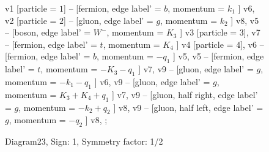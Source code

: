 \documentclass{revtex4}
\begin{document}
\begin{figure}[!htb]
\begin{center}
{    %
v1 [particle = \(1\)] -- [fermion, edge label' = \(b\), momentum = \(k_{1}\) ] v6, 
v2 [particle = \(2\)] -- [gluon, edge label' = \(g\), momentum = \(k_{2}\) ] v8, 
v5 -- [boson, edge label' = \(W^{-}\), momentum = \(K_{3}\) ] v3 [particle = \(3\)], 
v7 -- [fermion, edge label' = \(t\), momentum = \(K_{4}\) ] v4 [particle = \(4\)], 
v6 -- [fermion, edge label' = \(b\), momentum = \(-q_{1}\) ] v5, 
v5 -- [fermion, edge label' = \(t\), momentum = \(-K_{3} - q_{1}\) ] v7, 
v9 -- [gluon, edge label' = \(g\), momentum = \(-k_{1} - q_{1}\) ] v6, 
v9 -- [gluon, edge label' = \(g\), momentum = \(K_{3} + K_{4} + q_{1}\) ] v7, 
v9 -- [gluon, half right, edge label' = \(g\), momentum = \(-k_{2} + q_{2}\) ] v8, 
v9 -- [gluon, half left, edge label' = \(g\), momentum = \(-q_{2}\) ] v8, 
};
\end{center}
\caption{Diagram23, Sign: 1, Symmetry factor: 1/2}
\end{figure}
\newpage
\end{document}
